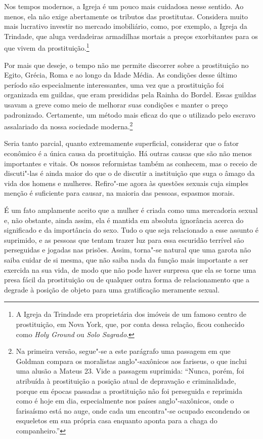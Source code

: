 Nos tempos modernos, a Igreja é um pouco mais cuidadosa nesse sentido.
Ao menos, ela não exige abertamente os tributos das prostitutas. Considera
muito mais lucrativo investir no mercado imobiliário, como, por
exemplo, a Igreja da Trindade, que aluga verdadeiras armadilhas mortais
a preços exorbitantes para os que vivem da prostituição.\footnote{A
  Igreja da Trindade era proprietária dos imóveis de um famoso centro de
  prostituição, em Nova York, que, por conta dessa relação, ficou
  conhecido como \textit{Holy Ground} ou \textit{Solo Sagrado}.}

Por mais que deseje, o tempo não me permite discorrer sobre a
prostituição no Egito, Grécia, Roma e ao longo da Idade Média. As
condições desse último período são especialmente interessantes, uma vez
que a prostituição foi organizada em guildas, que eram presididas pela Rainha do
Bordel. Essas guildas usavam a greve como meio de melhorar suas
condições e manter o preço padronizado. Certamente, um método mais
eficaz do que o utilizado pelo escravo assalariado da nossa sociedade
moderna.\footnote{Na primeira versão, segue"-se a este parágrafo uma
  passagem em que Goldman compara os moralistas anglo"-saxônicos aos
  fariseus, o que inclui uma alusão a Mateus 23. Vide a passagem
  suprimida: ``Nunca, porém, foi atribuída à prostituição a posição
  atual de depravação e criminalidade, porque em épocas passadas a
  prostituição não foi perseguida e reprimida como é hoje em dia,
  especialmente nos países anglo"-saxônicos, onde o farisaísmo está no
  auge, onde cada um encontra"-se ocupado escondendo os esqueletos em sua
  própria casa enquanto aponta para a chaga do companheiro.''}

Seria tanto parcial, quanto extremamente superficial, considerar que o\label{parcial}
fator econômico é a única causa da prostituição. Há outras causas que
são não menos importantes e vitais. Os nossos reformistas também as
conhecem, mas o receio de discuti"-las é ainda maior do que o de discutir
a instituição que suga o âmago da vida dos homens e mulheres. Refiro"-me
agora às questões sexuais cuja simples menção é suficiente para causar,
na maioria das pessoas, espasmos morais.

É um fato amplamente aceito que a mulher é criada como uma mercadoria
sexual e, não obstante, ainda assim, ela é mantida em absoluta
ignorância acerca do significado e da importância do sexo. Tudo o que
seja relacionado a esse assunto é suprimido, e as pessoas que tentam
trazer luz para essa escuridão terrível são perseguidas e jogadas nas
prisões. Assim, torna"-se natural que uma garota não saiba cuidar de si
mesma, que não saiba nada da função mais importante a ser exercida na
sua vida, de modo que não pode haver surpresa que ela se torne uma presa
fácil da prostituição ou de qualquer outra forma de relacionamento que a
degrade à posição de objeto para uma gratificação meramente sexual.\label{objeto}

